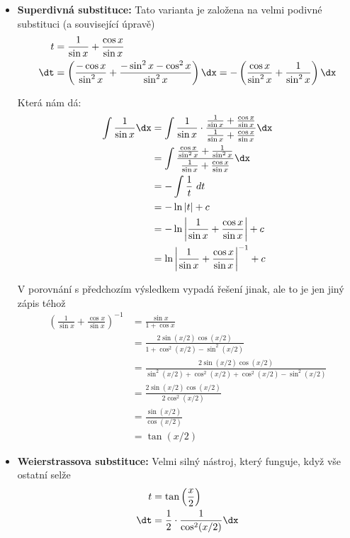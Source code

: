 {\begin{itemize}
				Schválně zkuste zderivovat výsledek (pro zkoušku).

		\item  \textbf{Superdivná substituce:}
			Tato varianta je založena na velmi podivné substituci (a související úpravě)
			\begin{align*}
				t &= \frac{1}{\sin x}+\frac{\cos x}{\sin x} \\
				\dt &= \left(\frac{-\cos x}{\sin^2 x}+\frac{-\sin^2 x - \cos^2 x}{\sin^2 x}\right) \dx = -\left(\frac{\cos x}{\sin^2 x}+\frac{1}{\sin^2 x}\right) \dx
			\end{align*}

			Která nám dá:
			\begin{align*}
				\int \frac{1}{\sin x}\dx &= \int \frac{1}{\sin x} \cdot \frac{\frac{1}{\sin x}+\frac{\cos x}{\sin x}}{\frac{1}{\sin x}+\frac{\cos x}{\sin x}} \dx \\
				&= \int \frac{\frac{\cos x}{\sin^2 x}+\frac{1}{\sin^2 x}}{\frac{1}{\sin x}+\frac{\cos x}{\sin x}} \dx \\
				&= -\int \frac{1}{t} \ dt \\
				&= -\ln |t| + c\\
				&= - \ln \left|\frac{1}{\sin x}+\frac{\cos x}{\sin x}\right|+ c \\
				&= \ln \left|\frac{1}{\sin x}+\frac{\cos x}{\sin x}\right|^{-1}+ c
			\end{align*}

			V porovnání s předchozím výsledkem vypadá řešení jinak, ale to je jen jiný zápis téhož
			\begin{align*}
				\left(\frac{1}{\sin x}+\frac{\cos x}{\sin x}\right)^{-1} &= \frac{\sin x}{1+\cos x} \\
				&= \frac{2 \sin(x/2) \cos(x/2)}{1+\cos^2(x/2)-\sin^2(x/2)}  \\
				&=\frac{2 \sin(x/2) \cos(x/2)}{\sin^2(x/2)+\cos^2(x/2)+\cos^2(x/2)-\sin^2(x/2)} \\
				&= \frac{2 \sin(x/2) \cos(x/2)}{2\cos^2(x/2)} \\
				&= \frac{ \sin(x/2)}{\cos(x/2)} \\
				&= \tan(x/2)
			\end{align*}

		\item  \textbf{Weierstrassova substituce:}
			Velmi silný nástroj, který funguje, když vše ostatní selže
			\begin{align*}
				t &= \tan \left(\frac{x}{2}\right) \\
				\dt &= \frac{1}{2} \cdot \frac{1}{\cos^2(x/2)} \dx %
			\end{align*}


\end{itemize}}
